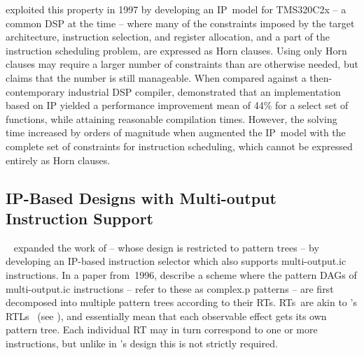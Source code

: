 \textcite{Gebotys1997a} exploited this property in 1997 by developing an
\gls{IP}~model for \gls{TMS320C2x} -- a common \gls{DSP} at the time -- where
many of the \glspl{constraint} imposed by the target architecture,
\gls{instruction selection}, and \gls{register allocation}, and a part of the
\gls{instruction scheduling} problem, are expressed as \glspl{Horn clause}.
%
Using only \glspl{Horn clause} may require a larger number of \glspl{constraint}
than are otherwise needed, but \citeauthor{Gebotys1997a} claims that the number
is still manageable.
%
When compared against a then-contemporary industrial \gls{DSP} \gls{compiler},
\citeauthor{Gebotys1997a} demonstrated that an implementation based on \gls{IP}
yielded a performance improvement mean of 44\% for a select set of functions,
while attaining reasonable compilation times.
%
However, the solving time increased by orders of magnitude when
\citeauthor{Gebotys1997a} augmented the \gls{IP}~model with the complete set of
\glspl{constraint} for \gls{instruction scheduling}, which cannot be expressed
entirely as \glspl{Horn clause}.


\subsection{IP-Based Designs with Multi-output Instruction Support}

\citeauthor{Leupers1996}~\cite{Leupers1995, Leupers1996} expanded the work of
\citeauthor{Wilson1994} -- whose design is restricted to \glspl{pattern tree} --
by developing an \gls{IP}-based \gls{instruction selector} which also supports
\gls{multi-output.ic} \glspl{instruction}.
%
In a paper from~1996, \citeauthor{Leupers1996} describe a scheme where the
\glspl{pattern DAG} of \gls{multi-output.ic} \glspl{instruction} --
\citeauthor{Leupers1996} refer to these as \gls{complex.p} \glspl{pattern} --
are first decomposed into multiple \glspl{pattern tree} according to their
\glspl{RT}.
%
\glspl{RT}~are akin to \citeauthor{Fraser1979}'s \glspl{RTL}~\cite{Fraser1979}
(see ), and essentially mean that each
observable effect gets its own \gls{pattern tree}.
%
Each individual \gls{RT} may in turn correspond to one or more
\glspl{instruction}, but unlike in \citeauthor{Fraser1979}'s design this is not
strictly required.

